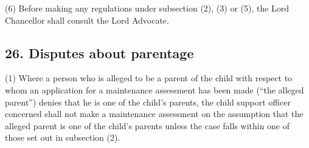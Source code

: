 \documentclass[12pt,a4paper]{article}
\begin{document}
(6) Before making any regulations under subsection (2), (3)  or (5), the Lord Chancellor shall consult the Lord Advocate.


\subsection{26. Disputes about parentage}

(1) Where a person who is alleged to be a parent of the child with respect to whom an application for a maintenance assessment has been made (“the alleged parent”) denies that he is one of the child’s parents, the child support officer concerned shall not make a maintenance assessment on the assumption that the alleged parent is one of the child’s parents unless the case falls within one of those set out in subsection (2).
\end{document}
